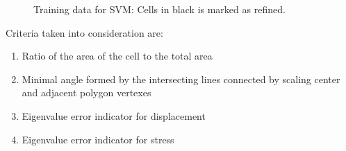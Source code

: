 \begin{figure}[!ht]
\begin{subfigure}[b]{0.49\linewidth}
{        }
    \end{subfigure}
    \begin{subfigure}[b]{0.49\linewidth}
    \end{subfigure}
    \caption[Training data for SVM]{Training data for SVM: Cells in black is marked as refined.}
    \label{adap_fig:svm_train_my}
\end{figure}

Criteria taken into consideration are: 
\begin{enumerate}
    \item Ratio of the area of the cell to the total area
    \item Minimal angle formed by the intersecting lines connected by scaling center and adjacent polygon vertexes
    \item Eigenvalue error indicator for displacement
    \item Eigenvalue error indicator for stress
\end{enumerate}

